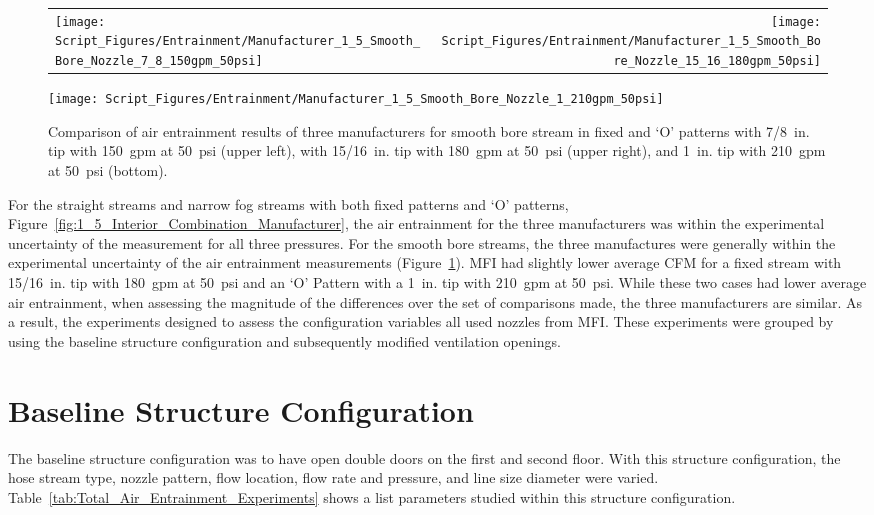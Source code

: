 \documentclass[12pt,oneside]{book}
\begin{document}
\begin{figure}[!ht]
\begin{tabular*}{\textwidth}{lr}
\texttt{[image: Script\_Figures/Entrainment/Manufacturer\_1\_5\_Smooth\_Bore\_Nozzle\_7\_8\_150gpm\_50psi]} &
\texttt{[image: Script\_Figures/Entrainment/Manufacturer\_1\_5\_Smooth\_Bore\_Nozzle\_15\_16\_180gpm\_50psi]} \\
\end{tabular*}
\centering
\texttt{[image: Script\_Figures/Entrainment/Manufacturer\_1\_5\_Smooth\_Bore\_Nozzle\_1\_210gpm\_50psi]} 
\caption[Average Air Entrainment Varying Manufacturer with Smooth Bore Nozzles]{Comparison of air entrainment results of three manufacturers for smooth bore stream in fixed and `O' patterns with 7/8~in. tip with 150~gpm at 50~psi (upper left), with 15/16~in. tip with 180~gpm at 50~psi (upper right), and 1~in. tip with 210~gpm at 50~psi (bottom).}
\label{fig:1_5_Interior_Smooth_Bore_Manufacturer}
\end{figure}

For the straight streams and narrow fog streams with both fixed patterns and `O' patterns, Figure~\ref{fig:1_5_Interior_Combination_Manufacturer}, the air entrainment for the three manufacturers was within the experimental uncertainty of the measurement for all three pressures. For the smooth bore streams, the three manufactures were generally within the experimental uncertainty of the air entrainment measurements (Figure~\ref{fig:1_5_Interior_Smooth_Bore_Manufacturer}). MFI had slightly lower average CFM for a fixed stream with 15/16~in. tip with 180~gpm at 50~psi and an `O' Pattern with a 1~in. tip with 210~gpm at 50~psi. While these two cases had lower average air entrainment, when assessing the magnitude of the differences over the set of comparisons made, the three manufacturers are similar. As a result, the experiments designed to assess the configuration variables all used nozzles from MFI. These experiments were grouped by using the baseline structure configuration and subsequently modified ventilation openings. %

\clearpage

\section{Baseline Structure Configuration}
The baseline structure configuration was to have open double doors on the first and second floor. With this structure configuration, the hose stream type, nozzle pattern, flow location, flow rate and pressure, and line size diameter were varied. Table~\ref{tab:Total_Air_Entrainment_Experiments} shows a list parameters studied within this structure configuration.
\end{document}
